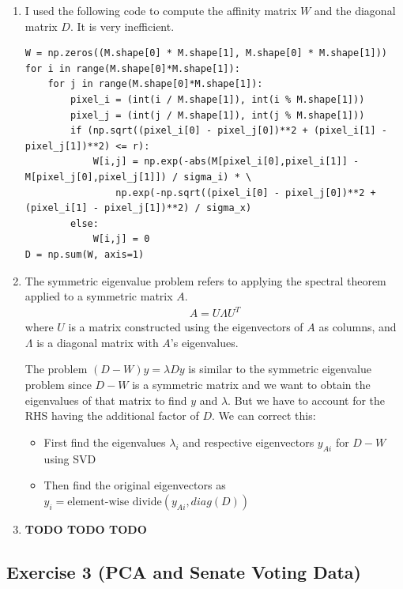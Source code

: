 \documentclass[11pt]{article}
\begin{document}
\begin{solution}
\begin{enumerate}
\item I used the following code to compute the affinity matrix $W$ and the diagonal matrix $D$. It is very inefficient.
    \begin{verbatim}
W = np.zeros((M.shape[0] * M.shape[1], M.shape[0] * M.shape[1]))
for i in range(M.shape[0]*M.shape[1]):
    for j in range(M.shape[0]*M.shape[1]):
        pixel_i = (int(i / M.shape[1]), int(i % M.shape[1]))
        pixel_j = (int(j / M.shape[1]), int(j % M.shape[1]))
        if (np.sqrt((pixel_i[0] - pixel_j[0])**2 + (pixel_i[1] - pixel_j[1])**2) <= r):
            W[i,j] = np.exp(-abs(M[pixel_i[0],pixel_i[1]] - M[pixel_j[0],pixel_j[1]]) / sigma_i) * \
                np.exp(-np.sqrt((pixel_i[0] - pixel_j[0])**2 + (pixel_i[1] - pixel_j[1])**2) / sigma_x)
        else:
            W[i,j] = 0
D = np.sum(W, axis=1)
\end{verbatim}

\item The symmetric eigenvalue problem refers to applying the spectral theorem applied to a symmetric matrix $A$.
\begin{align*}
    A = U \Lambda U^T
\end{align*}
where $U$ is a matrix constructed using the eigenvectors of $A$ as columns, and $\Lambda$ is a diagonal matrix with $A$'s eigenvalues.

The problem $(D-W)y = \lambda D y$ is similar to the symmetric eigenvalue problem since $D-W$ is a symmetric matrix and we want to obtain the eigenvalues of that matrix to find $y$ and $\lambda$. But we have to account for the RHS having the additional factor of $D$. We can correct this:

\begin{itemize}
    \item First find the eigenvalues $\lambda_i$ and respective eigenvectors $y_{Ai}$ for $D-W$ using SVD
    \item Then find the original eigenvectors as $y_i = \text{element-wise divide}(y_{Ai}, diag(D))$
\end{itemize}

\item \textbf{TODO TODO TODO}
\end{enumerate}
\end{solution}


\newpage
\subsection*{Exercise 3 (PCA and Senate Voting Data)}
\end{document}
